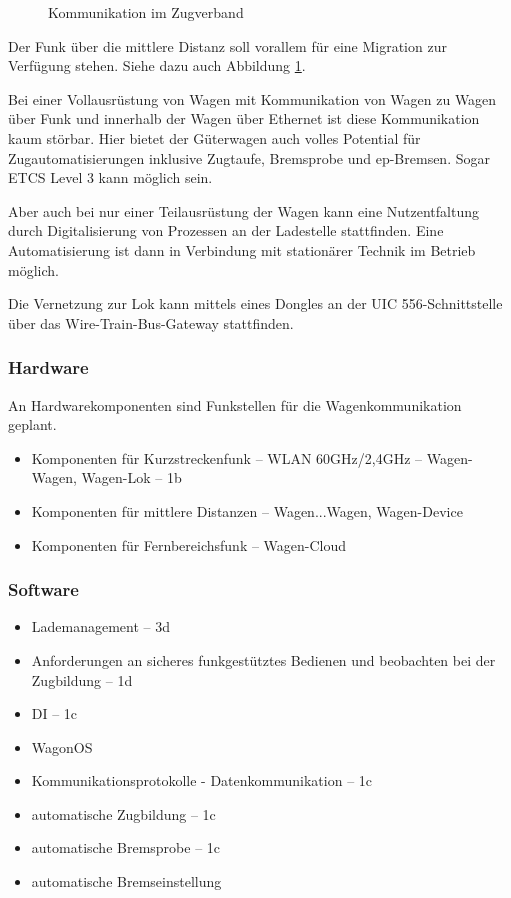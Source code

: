 \begin{figure}[hbt]
    \centering
    
    \caption{Kommunikation im Zugverband\cite{autonBetrieb}}
    \label{fig:Zugkomm}
\end{figure}
Der Funk über die mittlere Distanz soll vorallem für eine Migration zur Verfügung stehen. Siehe dazu auch Abbildung \ref{fig:Zugkomm}.\par
Bei einer Vollausrüstung von Wagen mit Kommunikation von Wagen zu Wagen über Funk und innerhalb der Wagen über Ethernet ist diese Kommunikation kaum störbar. Hier bietet der Güterwagen auch volles Potential für Zugautomatisierungen inklusive Zugtaufe, Bremsprobe und ep-Bremsen. Sogar ETCS Level 3 kann möglich sein.\par
Aber auch bei nur einer Teilausrüstung der Wagen kann eine Nutzentfaltung durch Digitalisierung von Prozessen an der Ladestelle stattfinden. Eine Automatisierung ist dann in Verbindung mit stationärer Technik im Betrieb möglich.\par
Die Vernetzung zur Lok kann mittels eines Dongles an der UIC 556-Schnittstelle über das Wire-Train-Bus-Gateway stattfinden.\par
\subsubsection{Hardware}
An Hardwarekomponenten sind Funkstellen für die Wagenkommunikation geplant.
\begin{itemize}
    \item Komponenten für Kurzstreckenfunk -- WLAN 60GHz/2,4GHz -- Wagen-Wagen, Wagen-Lok -- 1b
    \item Komponenten für mittlere Distanzen -- Wagen...Wagen, Wagen-Device
    \item Komponenten für Fernbereichsfunk -- Wagen-Cloud
\end{itemize}
\subsubsection{Software}
\begin{itemize}
    \item Lademanagement \label{sec:Lademanagment} -- 3d
    \item Anforderungen an sicheres funkgestütztes Bedienen und beobachten bei der Zugbildung -- 1d
    \item DI -- 1c
    \item WagonOS
    \item Kommunikationsprotokolle - Datenkommunikation -- 1c
    \item automatische Zugbildung -- 1c
    \item automatische Bremsprobe -- 1c
    \item automatische Bremseinstellung
\end{itemize}